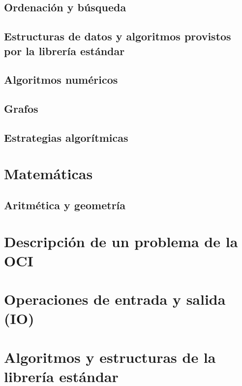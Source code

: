 \documentclass{article}
\newcommand{\new}{\color{red}}
\begin{document}
\subsection{Ordenación y búsqueda}


\subsection{Estructuras de datos y algoritmos provistos por la librería estándar}


\subsection{Algoritmos numéricos}


\subsection{Grafos}


{\new
\subsection{Estrategias algorítmicas}

}

{\new
\section{Matemáticas}
\subsection{Aritmética y geometría}

}


\newpage
\appendix
\section{Descripción de un problema de la OCI}
\label{problem-description}


\section{Operaciones de entrada y salida (IO)}
\label{tech-IO}


\section{Algoritmos y estructuras de la librería estándar}

\end{document}
